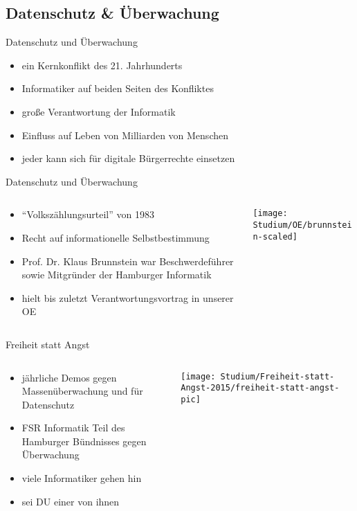 \documentclass{beamer}
\begin{document}
\subsection{Datenschutz \& Überwachung}
\begin{frame}{Datenschutz und Überwachung}
  \begin{itemize}
    \item ein Kernkonflikt des 21. Jahrhunderts
    \item Informatiker auf beiden Seiten des Konfliktes
    \item große Verantwortung der Informatik
    \item Einfluss auf Leben von Milliarden von Menschen
    \item jeder kann sich für digitale Bürgerrechte einsetzen
  \end{itemize}
\end{frame}
\begin{frame}{Datenschutz und Überwachung}
  \begin{columns}[T]
    \begin{column}{0.48\textwidth}
      \begin{itemize}
        \item "`Volkszählungsurteil"' von 1983
        \item Recht auf informationelle Selbstbestimmung
        \item Prof. Dr. Klaus Brunnstein war Beschwerdeführer sowie Mitgründer der Hamburger Informatik
        \item hielt bis zuletzt Verantwortungsvortrag in unserer OE
      \end{itemize}
    \end{column}
    \hfill
    \begin{column}{0.5\textwidth}
      \centering
      \texttt{[image: Studium/OE/brunnstein-scaled]}
    \end{column}
  \end{columns}
\end{frame}
\begin{frame}{Freiheit statt Angst}
  \begin{columns}[T]
    \begin{column}{.48\textwidth}
      \begin{itemize}
        \item jährliche Demos gegen Massenüberwachung und für Datenschutz
        \item FSR Informatik Teil des Hamburger Bündnisses gegen Überwachung
        \item viele Informatiker gehen hin
        \item sei DU einer von ihnen
      \end{itemize}
    \end{column}
    \hfill
    \begin{column}{0.5\textwidth}
      \centering
      \texttt{[image: Studium/Freiheit-statt-Angst-2015/freiheit-statt-angst-pic]}
    \end{column}
  \end{columns}
\end{frame}
\end{document}
